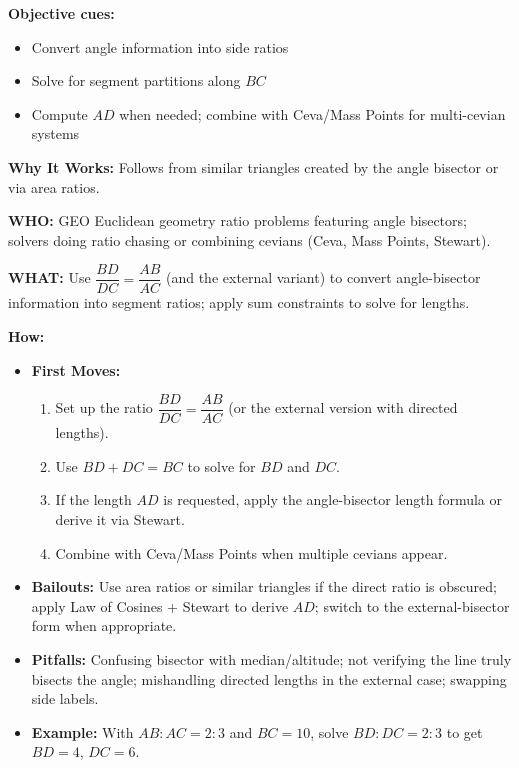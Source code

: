 \documentclass[12pt]{article}
\begin{document}
\textbf{Objective cues:}
\begin{itemize}
    \item Convert angle information into side ratios
    \item Solve for segment partitions along $BC$
    \item Compute $AD$ when needed; combine with Ceva/Mass Points for multi-cevian systems
\end{itemize}

\textbf{Why It Works:} Follows from similar triangles created by the angle bisector or via area ratios.

\textbf{WHO:} GEO Euclidean geometry ratio problems featuring angle bisectors; solvers doing ratio chasing or combining cevians (Ceva, Mass Points, Stewart).

\textbf{WHAT:} Use $\dfrac{BD}{DC} = \dfrac{AB}{AC}$ (and the external variant) to convert angle-bisector information into segment ratios; apply sum constraints to solve for lengths.


\textbf{How:}
\begin{itemize}
    \item \textbf{First Moves:}
    \begin{enumerate}[nosep]
        \item Set up the ratio $\dfrac{BD}{DC} = \dfrac{AB}{AC}$ (or the external version with directed lengths).
        \item Use $BD + DC = BC$ to solve for $BD$ and $DC$.
        \item If the length $AD$ is requested, apply the angle-bisector length formula or derive it via Stewart.
        \item Combine with Ceva/Mass Points when multiple cevians appear.
    \end{enumerate}
    \item \textbf{Bailouts:} Use area ratios or similar triangles if the direct ratio is obscured; apply Law of Cosines + Stewart to derive $AD$; switch to the external-bisector form when appropriate.
    \item \textbf{Pitfalls:} Confusing bisector with median/altitude; not verifying the line truly bisects the angle; mishandling directed lengths in the external case; swapping side labels.
    \item \textbf{Example:} With $AB:AC=2:3$ and $BC=10$, solve $BD:DC=2:3$ to get $BD=4$, $DC=6$.
\end{itemize}
\end{document}
